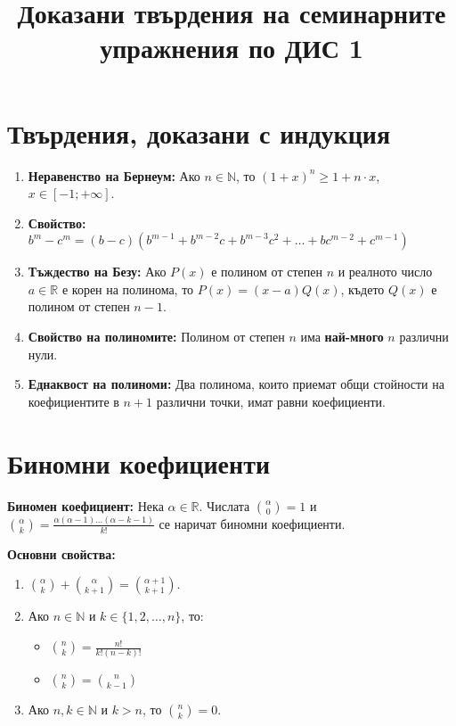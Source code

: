 \documentclass[11pt,oneside,a4paper]{article}
\begin{document}
\title{Доказани твърдения на семинарните упражнения по ДИС 1}
\date{}
\maketitle
\vspace{-4em} 

\section*{Твърдения, доказани с индукция}

\begin{enumerate}
    \item \textbf{Неравенство  на Бернеум:}  
    Ако \(n \in \mathbb{N} \), то \((1 + x)^n \geq 1 + n \cdot x\), \(x \in [-1; +\infty]\).
    \item \textbf{Свойство:} 
    \(b^m - c^m = (b - c)(b^{m-1} + b^{m-2}c + b^{m-3}c^2 + \dots + bc^{m-2} + c^{m-1})\)
    \item \textbf{Тъждество на Безу:}  
    Ако \(P(x)\) е полином от степен \(n\) и реалното число \(a \in \mathbb{R}\) е корен на полинома, то \(P(x) = (x-a)Q(x)\), където \(Q(x)\) е полином от степен \(n-1\).
    \item \textbf{Свойство на полиномите:}  
    Полином от степен \(n\) има \textbf{най-много} \(n\) различни нули.
    \item \textbf{Еднаквост на полиноми:}  
    Два полинома, които приемат общи стойности на коефициентите в \(n+1\) различни точки, имат равни коефициенти.
\end{enumerate}

\section*{Биномни коефициенти}

\textbf{Биномен коефициент:}  
Нека \(\alpha \in \mathbb{R}\). Числата \(\binom{\alpha}{0} = 1\) и \(\binom{\alpha}{k} = \frac{\alpha(\alpha - 1)\dots(\alpha - k - 1)}{k!}\) се наричат биномни коефициенти.

\textbf{Основни свойства:} \vspace{-\baselineskip}
\begin{enumerate}[label=\textbf{(\alph*)}]
    \item \(\binom{\alpha}{k} + \binom{\alpha}{k+1} = \binom{\alpha + 1}{k + 1}\).
    \item Ако \(n \in \mathbb{N}\) и \(k \in \{1, 2, \dots, n\}\), то:
    \begin{itemize}
        \item \(\binom{n}{k} = \frac{n!}{k!(n-k)!}\)
        \item \(\binom{n}{k} = \binom{n}{k-1}\)
    \end{itemize}
    \item Ако \(n, k \in \mathbb{N}\) и \(k > n\), то \(\binom{n}{k} = 0\).
\end{enumerate}
\end{document}
